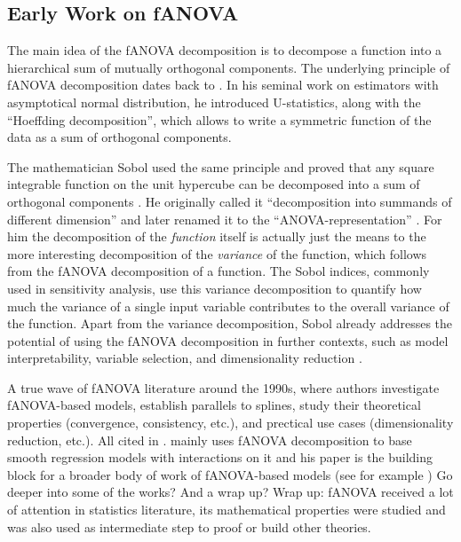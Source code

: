 
\subsection{Early Work on fANOVA}
The main idea of the fANOVA decomposition is to decompose a function into a hierarchical sum of mutually orthogonal components.
The underlying principle of fANOVA decomposition dates back to \cite{hoeffding1948}. In his seminal work on estimators with asymptotical normal distribution, he introduced U-statistics, along with the ``Hoeffding decomposition'', which allows to write a symmetric function of the data as a sum of orthogonal components.\par
The mathematician Sobol used the same principle and proved that any square integrable function on the unit hypercube can be decomposed into a sum of orthogonal components \citep{sobol1993sensitivity}.
He originally called it ``decomposition into summands of different dimension'' and later renamed it to the ``ANOVA-representation'' \citep{sobol2001}. For him the decomposition of the \textit{function} itself is actually just the means to the more interesting decomposition of the \textit{variance} of the function, which follows from the fANOVA decomposition of a function.
The Sobol indices, commonly used in sensitivity analysis, use this variance decomposition to quantify how much the variance of a single input variable contributes to the overall variance of the function.
Apart from the variance decomposition, Sobol already addresses the potential of using the fANOVA decomposition in further contexts, such as model interpretability, variable selection, and dimensionality reduction \cite{sobol2001}.\par


A true wave of fANOVA literature around the 1990s, where authors investigate fANOVA-based models, establish parallels to splines, study their theoretical properties (convergence, consistency, etc.), and prectical use cases (dimensionality reduction, etc.). All cited in \cite{huang1998a}.
\cite{stone1994} mainly uses fANOVA  decomposition to base smooth regression models with interactions on it and his paper is the building block for a broader body of work of fANOVA-based models (see for example \cite{Huang1996, huang1998a})
Go deeper into some of the works? And a wrap up? Wrap up: fANOVA received a lot of attention in statistics literature, its mathematical properties were studied and was also used as intermediate step to proof or build other theories.

